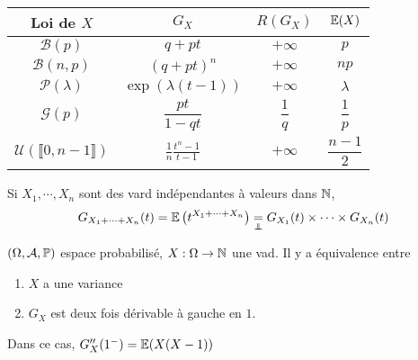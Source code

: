 \begin{ex}~
    \begin{center}
        \begin{tabular}{cccc}
            \hline \hline Loi de $X$ & $G_X$ & $R(G_X)$ & $ \E(X)$ \\
            \hline
            \rule{0pt}{2em} $\mathcal  B(p)$ &  $q+pt$ &  $+\infty$ &  $p$ \\
            \rule{0pt}{2em} $\mathcal B(n,p)$ &  $(q+pt)^n$ &  $+\infty$ & $np$ \\
            \rule{0pt}{2em} $\mathcal  P(\lambda)$ & $\exp (\lambda(t-1))$ & $+\infty$ & $\lambda$ \\
            \rule{0pt}{2em} $\mathcal  G(p)$ & $\dfrac{pt}{1-qt}$ &  $\dfrac{1}{q}$ & $\dfrac{1}{p}$ \\
            \rule{0pt}{2em} $\mathcal U(\llbracket 0,n-1 \rrbracket )$ & $\displaystyle \frac{1}{n} \frac{t^n-1}{t-1}$ & $+\infty$ &  $\dfrac{n-1}2$ \\
            \hline
        \end{tabular}
    \end{center}
\end{ex}

\begin{rem}
Si $ X_1,\cdots ,X_n$ sont des vard indépendantes à valeurs dans $ \N$, \[
    G_{X_1+\cdots +X_n}(t)=\E\left(t^{X_1+\cdots +X_n}\right)\underset\indep=G_{X_1}(t)\times \cdots \times G_{X_n}(t)
\] 
\end{rem}

\begin{thm}
    \Hyp $(\Omega,\mathcal A,\P)$ espace probabilisé, $X:\Omega\to \N$ une vad.
    \Conc Il y a équivalence entre \begin{enumerate}
        \item $X$ a une variance
        \item  $G_X$ est deux fois dérivable à gauche en  $1$.
    \end{enumerate}
    Dans ce cas, $G_X''(1^-)=\E(X(X-1))$
\end{thm}
